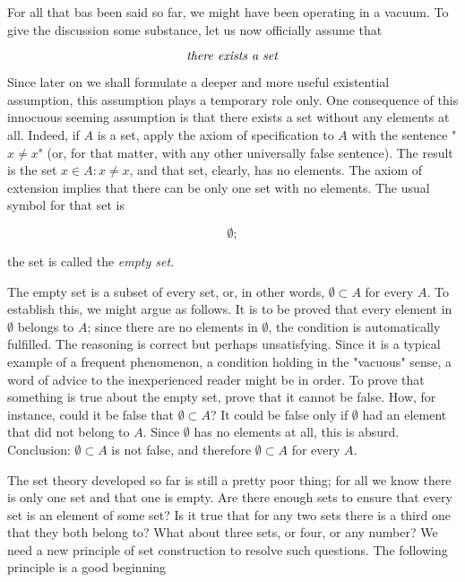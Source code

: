 
For all that bas been said so far, we might have been operating in a vacuum. To give the discussion some substance, let us now officially assume that

\begin{equation*}
\text{ \textit{there exists a set} }
\end{equation*}
 
Since later on we shall formulate a deeper and more useful existential assumption, this  assumption  plays  a temporary role only. One consequence of this innocuous seeming assumption is that there exists a set without any elements at all. Indeed, if $A$ is a set, apply the axiom of specification to $A$ with the sentence "$ x \neq x $"  (or, for that matter, with any other universally false sentence). The result is the set ${x \in A: x \neq x}$, and that set, clearly, has no elements. The axiom of extension implies that there can be only one set with no elements. The usual symbol for that set is 

\begin{equation*}
\emptyset ;
\end{equation*}


the set is called the \textit{empty set}. 

The empty set is a subset of every set, or, in other words, $ \emptyset \subset A$ for every $A$. To establish this, we might argue as follows. It is to be proved that every element in $ \emptyset $ belongs to $A$; since there are no elements in $ \emptyset $, the condition is automatically fulfilled. The reasoning is correct but perhaps unsatisfying. Since it is a typical example of a frequent phenomenon, a condition holding in the "vacuous" sense, a word of advice to the inexperienced reader might be in order. To prove that something is true about the empty set, prove that it cannot be false. How, for instance, could it be false that $ \emptyset \subset A$? It could be false only if $ \emptyset $ had an element that did not belong to $A$. Since $ \emptyset $ has no elements at all, this is absurd. Conclusion: $ \emptyset \subset A$ is not false, and therefore $ \emptyset \subset A$ for every $A$.

The set theory developed so far is still a pretty poor thing; for all we know there is only one set and that one is empty. Are there enough sets to ensure that every set is an element of some set? Is it true that for any two sets there is a third one that they both belong to? What about three sets, or four, or any number? We need a new principle of set construction to resolve such questions. The following principle is a good beginning 

